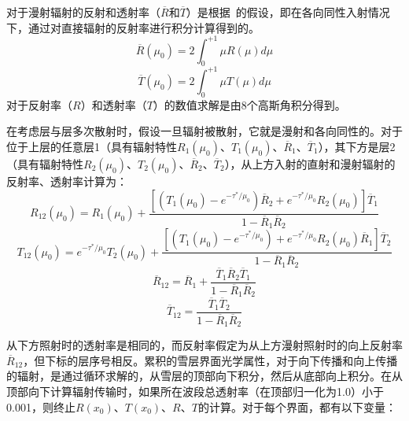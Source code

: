 对于漫射辐射的反射和透射率（\(\overline{R}\)和\(\overline{T}\)）是根据~\citet{wiscombe1980ModelSpectralAlbedo}的假设，即在各向同性入射情况下，通过对直接辐射的反射率进行积分计算得到的。
%
\begin{equation}
\overline{R}\left( \mu_{0} \right) = 2\int_{0}^{+ 1}{\mu R(\mu)d\mu}
\end{equation}
\begin{equation}
\overline{T}\left( \mu_{0} \right) = 2\int_{0}^{+ 1}{\mu T(\mu)d\mu}
\end{equation}
%
对于反射率（$R$）和透射率（$T$）的数值求解是由8个高斯角积分得到。

在考虑层与层多次散射时，假设一旦辐射被散射，它就是漫射和各向同性的。对于位于上层的任意层1（具有辐射特性\(R_{1}\left( \mu_{0} \right)\)、\(T_{1}\left( \mu_{0} \right)\)、\({\overline{R}}_{1}\)、\({\overline{T}}_{1}\)），其下方是层2（具有辐射特性\(R_{2}\left( \mu_{0} \right)\)、\(T_{2}\left( \mu_{0} \right)\)、\({\overline{R}}_{2}\)、\({\overline{T}}_{2}\)），从上方入射的直射和漫射辐射的反射率、透射率计算为\citep{briegleb2007delta}：
\begin{equation}
R_{12}\left( \mu_{0} \right) = R_{1}\left( \mu_{0} \right) + \frac{\left\lbrack \left( T_{1}\left( \mu_{0} \right) - e^{- \tau^{*}/\mu_{0}} \right){\overline{R}}_{2} + e^{- \tau^{*}/\mu_{0}}R_{2}\left( \mu_{0} \right) \right\rbrack{\overline{T}}_{1}}{1 - {\overline{R}}_{1}{\overline{R}}_{2}}
\end{equation}
\begin{equation}
T_{12}\left( \mu_{0} \right) = {e^{- \tau^{*}/\mu_{0}}T}_{2}\left( \mu_{0} \right) + \frac{\left\lbrack \left( T_{1}\left( \mu_{0} \right) - e^{- \tau^{*}/\mu_{0}} \right) + e^{- \tau^{*}/\mu_{0}}R_{2}\left( \mu_{0} \right){\overline{R}}_{1} \right\rbrack{\overline{T}}_{2}}{1 - {\overline{R}}_{1}{\overline{R}}_{2}}
\end{equation}
\begin{equation}
{\overline{R}}_{12} = {\overline{R}}_{1} + \frac{{\overline{T}}_{1}{\overline{R}}_{2}{\overline{T}}_{1}}{1 - {\overline{R}}_{1}{\overline{R}}_{2}}
\end{equation}
\begin{equation}
{\overline{T}}_{12} = \frac{{\overline{T}}_{1}{\overline{T}}_{2}}{1 - {\overline{R}}_{1}{\overline{R}}_{2}}
\end{equation}

从下方照射时的透射率是相同的，而反射率假定为从上方漫射照射时的向上反射率\({\overline{R}}_{12}\)，但下标的层序号相反。累积的雪层界面光学属性，对于向下传播和向上传播的辐射，是通过循环求解的，从雪层的顶部向下积分，然后从底部向上积分。在从顶部向下计算辐射传输时，如果所在波段总透射率（在顶部归一化为1.0）小于0.001，则终止\(R\left( x_{0} \right)\)、\(T\left( x_{0} \right)\)、\(R\)、\(T\)的计算。对于每个界面，都有以下变量：

